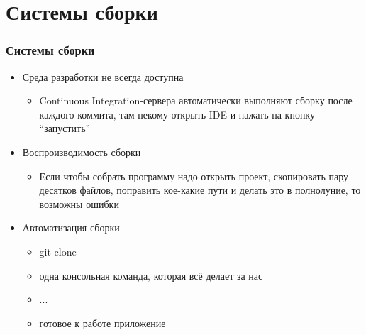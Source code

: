 \documentclass{../../slides-style}
\begin{document}
    \begin{frame}[plain]
        \titlepage
    \end{frame}

    \section{Системы сборки}

    \begin{frame}
        \frametitle{Системы сборки}
        \begin{itemize}
            \item Среда разработки не всегда доступна
            \begin{itemize}
                \item Continuous Integration-сервера автоматически выполняют сборку после каждого коммита, там некому открыть IDE и нажать на кнопку ``запустить''
            \end{itemize}
            \item Воспроизводимость сборки
            \begin{itemize}
                \item Если чтобы собрать программу надо открыть проект, скопировать пару десятков файлов, поправить кое-какие пути и делать это в полнолуние, то возможны ошибки
            \end{itemize}
            \item Автоматизация сборки
            \begin{itemize}
                \item git clone
                \item одна консольная команда, которая всё делает за нас
                \item ...
                \item готовое к работе приложение
            \end{itemize}
        \end{itemize}
    \end{frame}
\end{document}
